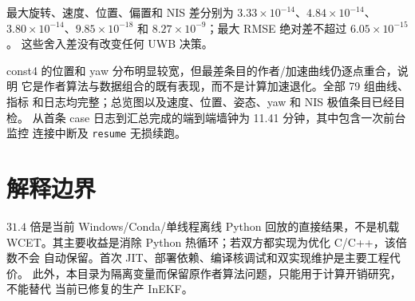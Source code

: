 \documentclass[11pt,a4paper]{ctexart}
\begin{document}
最大旋转、速度、位置、偏置和 NIS 差分别为
$3.33\times10^{-14}$、$4.84\times10^{-14}$、
$3.80\times10^{-14}$、$9.85\times10^{-18}$ 和
$8.27\times10^{-9}$；最大 RMSE 绝对差不超过 $6.05\times10^{-15}$。
这些舍入差没有改变任何 UWB 决策。

const4 的位置和 yaw 分布明显较宽，但最差条目的作者/加速曲线仍逐点重合，说明
它是作者算法与数据组合的既有表现，而不是计算加速退化。全部 79 组曲线、指标
和日志均完整；总览图以及速度、位置、姿态、yaw 和 NIS 极值条目已经目检。
从首条 case 日志到汇总完成的端到端墙钟为 11.41 分钟，其中包含一次前台监控
连接中断及 \texttt{resume} 无损续跑。

\section{解释边界}

$31.4$ 倍是当前 Windows/Conda/单线程离线 Python 回放的直接结果，不是机载
WCET。其主要收益是消除 Python 热循环；若双方都实现为优化 C/C++，该倍数不会
自动保留。首次 JIT、部署依赖、编译核调试和双实现维护是主要工程代价。
此外，本目录为隔离变量而保留原作者算法问题，只能用于计算开销研究，不能替代
当前已修复的生产 InEKF。
\end{document}
